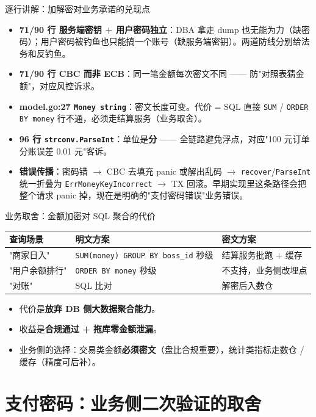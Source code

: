 \documentclass[aspectratio=169,11pt]{beamer}
\begin{document}
\begin{frame}[shrink]{逐行讲解：加解密对业务承诺的兑现点}
\begin{itemize}\small
  \item \textbf{71/90 行 服务端密钥 + 用户密码独立}：DBA 拿走 dump 也无能为力（缺密码）；用户密码被钓鱼也只能搞一个账号（缺服务端密钥）。两道防线分别给法务和反钓鱼。
  \item \textbf{71/90 行 CBC 而非 ECB}：同一笔金额每次密文不同 —— 防"对照表猜金额"，对应风控诉求。
  \item \textbf{model.go:27 \texttt{Money string}}：密文长度可变。代价 = SQL 直接 \texttt{SUM} / \texttt{ORDER BY money} 行不通，必须走结算服务（业务取舍）。
  \item \textbf{96 行 \texttt{strconv.ParseInt}}：单位是\textbf{分} —— 全链路避免浮点，对应"100 元订单分账误差 0.01 元"客诉。
  \item \textbf{错误传播}：密码错 $\to$ CBC 去填充 panic 或解出乱码 $\to$ \texttt{recover}/\texttt{ParseInt} 统一折叠为 \texttt{ErrMoneyKeyIncorrect} $\to$ TX 回滚。早期实现里这条路径会把整个请求 panic 掉，现在是明确的"支付密码错误"业务错误。
\end{itemize}
\end{frame}

\begin{frame}[shrink]{业务取舍：金额加密对 SQL 聚合的代价}
\small
\begin{tabular}{@{}lll@{}}
\toprule
查询场景 & 明文方案 & 密文方案 \\
\midrule
"商家日入" & \texttt{SUM(money) GROUP BY boss\_id} 秒级 & 结算服务批跑 + 缓存 \\
"用户余额排行" & \texttt{ORDER BY money} 秒级 & 不支持，业务侧改埋点 \\
"对账" & SQL 比对 & 解密后入数仓 \\
\bottomrule
\end{tabular}
\vspace{2mm}
\begin{itemize}\small
  \item 代价是\textbf{放弃 DB 侧大数据聚合能力}。
  \item 收益是\textbf{合规通过 + 拖库零金额泄漏}。
  \item 业务侧的选择：交易类金额\textbf{必须密文}（盘比合规重要），统计类指标走数仓 / 缓存（精度可后补）。
\end{itemize}
\end{frame}

\section{支付密码：业务侧二次验证的取舍}
\end{document}
